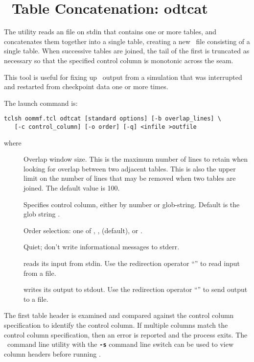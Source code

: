 
\section{\ODT\ Table Concatenation: odtcat}\label{sec:odtcat}%

The  utility reads an
 file on stdin that
contains one or more tables, and concatenates them together into a
single table, creating a new \ODT\ file consisting of a single table.
When successive tables are joined, the tail of the first is truncated as
necessary so that the specified control column is monotonic across the
seam.

This tool is useful for fixing up \ODT\ output from a simulation that
was interrupted and restarted from checkpoint data one or more times.

The  launch command is:
\begin{verbatim}
tclsh oommf.tcl odtcat [standard options] [-b overlap_lines] \
   [-c control_column] [-o order] [-q] <infile >outfile
\end{verbatim}
where
\begin{description}
\item[]
  Overlap window size.  This is the maximum number of lines to retain
  when looking for overlap between two adjacent tables.  This is also
  the upper limit on the number of lines that may be removed when
  two tables are joined.  The default value is 100.
\item[]
  Specifies control column, either by number or glob-string.  Default
  is the glob string
  .
\item[\optkey{-o order}]
  Order selection: one of , , 
  (default), or \cd{none}.
\item[]
  Quiet; don't write informational messages to stderr.
\item[]
   reads its input from stdin.  Use the redirection operator
  ``\boa'' to read input from a file.
\item[]
   writes its output to stdout.  Use the redirection operator
  ``\bca'' to send output to a file.
\end{description}
The first table header is examined and compared against the control
column specification to identify the control column.  If multiple
columns match the control column specification, then an error is
reported and the process exits.  The \OOMMF\ command line utility
{}
with the \texttt{\textbf{-s}} command line switch can be used to view
column headers before running \app{odtcat}.


